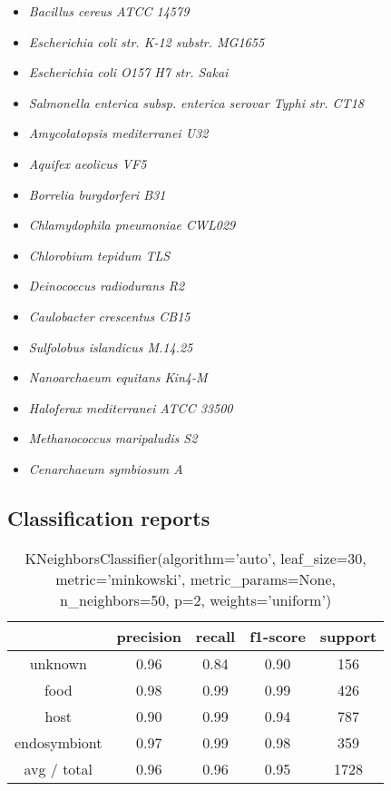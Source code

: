 \begin{itemize}
    \item		\textit{Bacillus cereus ATCC 14579}
    \item		\textit{Escherichia coli str. K-12 substr. MG1655}
    \item		\textit{Escherichia coli O157 H7 str. Sakai}
    \item		\textit{Salmonella enterica subsp. enterica serovar Typhi str. CT18}
    \item		\textit{Amycolatopsis mediterranei U32}
    \item		\textit{Aquifex aeolicus VF5}
    \item		\textit{Borrelia burgdorferi B31}
    \item		\textit{Chlamydophila pneumoniae CWL029}
    \item		\textit{Chlorobium tepidum TLS}
    \item		\textit{Deinococcus radiodurans R2}
    \item		\textit{Caulobacter crescentus CB15}
    \item		\textit{Sulfolobus islandicus M.14.25}
    \item		\textit{Nanoarchaeum equitans Kin4-M}
    \item		\textit{Haloferax mediterranei ATCC 33500}
    \item		\textit{Methanococcus maripaludis S2}
    \item		\textit{Cenarchaeum symbiosum A}
\end{itemize}

\subsection{Classification reports}
\label{sec:classification}

\begin{table}[ht!]
    \begin{tabular}{|c| c c c c |}
        \hline
        & \textbf{precision}  &  \textbf{recall} &  \textbf{f1-score} & \textbf{support} \\
        \hline
        unknown &      0.96    &  0.84  &    0.90  &      156 \\
        food    &      0.98    &  0.99  &    0.99  &    426 \\ 
        host    &      0.90    &  0.99  &    0.94  &     787 \\ 
endosymbiont    &      0.97    &  0.99  &    0.98  &     359 \\
\hline
avg / total    &      0.96    &  0.96  &    0.95  & 1728 \\
 \hline
 \end{tabular}
 \caption[K-Neighbours classifier report]{KNeighborsClassifier(algorithm='auto', leaf\_size=30, metric='minkowski',
 metric\_params=None, n\_neighbors=50, p=2, weights='uniform')}
 \end{table}

